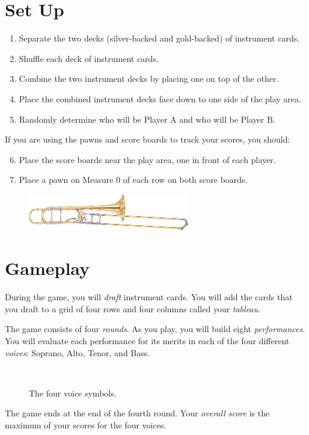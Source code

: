 \documentclass[a6paper, 12pt, parskip=half, DIV=14]{scrartcl}
\begin{document}
\section*{Set Up}
\begin{enumerate}[leftmargin=4ex]
  \item Separate the two decks (silver-backed and gold-backed) of instrument cards. 
  \item Shuffle each deck of instrument cards.
  \item Combine the two instrument decks by placing one on top of the other.
  \item Place the combined instrument decks face down to one side of the play area.
  \item Randomly determine who will be Player A and who will be Player B.
 \end{enumerate}
 If you are using the pawns and score boards to track your scores, you should:
\begin{enumerate}[leftmargin=4ex]
  \setcounter{enumi}{5}
  \item Place the score boards near the play area, one in front of each player.
  \item Place a pawn on Measure 0 of each row on both score boards. 
\end{enumerate}

\vfill

\begin{figure}[h]
\centering
\includegraphics[width=7cm]{Images/wikipedia_trombone.jpg}
\end{figure}


\newpage
\enlargethispage{1.75\baselineskip}
\section*{Gameplay}
During the game, you will \emph{draft} instrument cards. You will add the cards that you draft to a grid of four rows and four columns called your \emph{tableau}.

The game consists of four \emph{rounds}. As you play, you will build eight \emph{performances}.
You will evaluate each performance for its merits in each of the four different \emph{voices}: Soprano, Alto, Tenor, and Bass.
{

\begin{figure}[h]
\centering
\Huge
{} \ \  \ \  \ \ 
\caption*{The four voice symbols.}
\end{figure}
}
The game ends at the end of the fourth round. Your \emph{overall score} is the maximum of your scores for the four voices.
\end{document}
